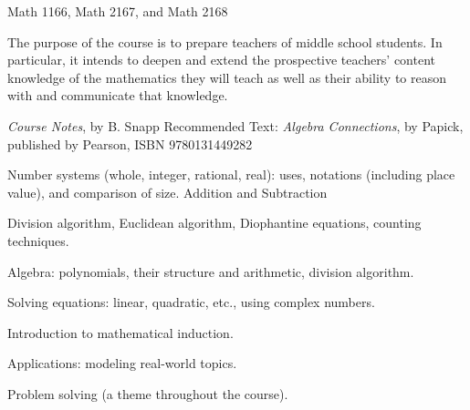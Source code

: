 \documentclass{osucourse}
\begin{document}
\CatalogDescription
\PrerequisitesAndExclusions

\begin{FollowupCourses}
Math 1166, Math 2167, and Math 2168
\end{FollowupCourses}

\begin{Purpose}
The purpose of the course is to prepare teachers of middle school students. In particular, it intends to deepen and extend the prospective teachers’ content knowledge of the mathematics they will teach as well as their ability to reason with and communicate that knowledge.
\end{Purpose}

\begin{Text}
\emph{Course Notes}, by B. Snapp Recommended Text:       \emph{Algebra Connections}, by Papick, published by Pearson, ISBN 9780131449282
\end{Text}

\begin{TopicsList}
\item Number systems (whole, integer, rational, real): uses, notations (including place value), and comparison of size. Addition and Subtraction
\item Division algorithm, Euclidean algorithm, Diophantine equations, counting techniques.
\item Algebra: polynomials, their structure and arithmetic, division algorithm.
\item Solving equations: linear, quadratic, etc., using complex numbers.
\item Introduction to mathematical induction.
\item Applications: modeling real-world topics.
\item Problem solving (a theme throughout the course).
\end{TopicsList}
\end{document}
